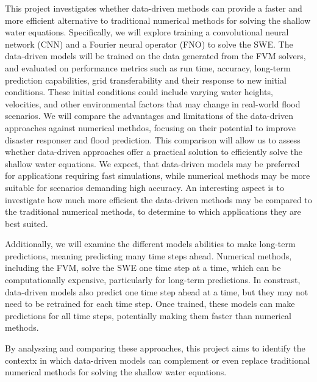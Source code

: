 This project investigates whether data-driven methods can provide a faster and more efficient alternative to traditional numerical methods for solving the shallow water equations.
Specifically, we will explore training a convolutional neural network (CNN) and a Fourier neural operator (FNO) to solve the SWE.
The data-driven models will be trained on the data generated from the FVM solvers, and evaluated on performance metrics such as run time, accuracy, long-term prediction capabilities, grid transferability and their response to new initial conditions.
These initial conditions could include varying water heights, velocities, and other environmental factors that may change in real-world flood scenarios.
We will compare the advantages and limitations of the data-driven approaches against numerical methdos, focusing on their potential to improve disaster responser and flood prediction.%
This comparison will allow us to assess whether data-driven approaches offer a practical solution to efficiently solve the shallow water equations.
We expect, that data-driven models may be preferred for applications requiring fast simulations, while numerical methods may be more suitable for scenarios demanding high accuracy.
An interesting aspect is to investigate how much more efficient the data-driven methods may be compared to the traditional numerical methods, to determine to which applications they are best suited.

Additionally, we will examine the different models abilities to make long-term predictions, meaning predicting many time steps ahead.
Numerical methods, including the FVM, solve the SWE one time step at a time, which can be computationally expensive, particularly for long-term predictions.
In constrast, data-driven models also predict one time step ahead at a time, but they may not need to be retrained for each time step.
Once trained, these models can make predictions for all time steps, potentially making them faster than numerical methods.

By analyszing and comparing these approaches, this project aims to identify the contextx in which data-driven models can complement or even replace traditional numerical methods for solving the shallow water equations.

